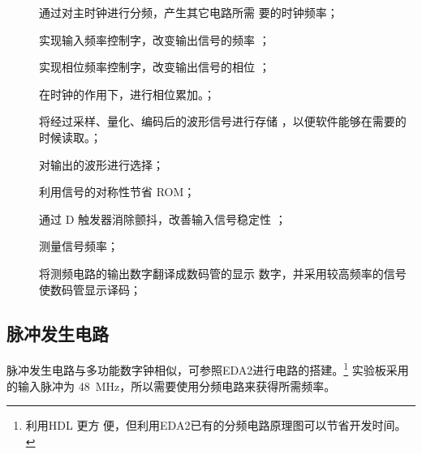 \documentclass[twoside, openright]{article}
\begin{document}
\begin{description}

	\item[] 通过对主时钟进行分频，产生其它电路所需
		要的时钟频率；

	\item[] 实现输入频率控制字，改变输出信号的频率
		；

	\item[] 实现相位频率控制字，改变输出信号的相位
		；

	\item[] 在时钟的作用下，进行相位累加。；

	\item[] 将经过采样、量化、编码后的波形信号进行存储
		，以便软件能够在需要的时候读取。；

	\item[] 对输出的波形进行选择；

	\item[] 利用信号的对称性节省 ROM；

	\item[] 通过 D 触发器消除颤抖，改善输入信号稳定性
		；

	\item[] 测量信号频率；

	\item[] 将测频电路的输出数字翻译成数码管的显示
		数字，并采用较高频率的信号使数码管显示译码；

\end{description}

\subsection{脉冲发生电路}%
\label{sub:脉冲发生电路}

脉冲发生电路与多功能数字钟相似，可参照EDA2进行电路的搭建。\footnote{利用HDL 更方
便，但利用EDA2已有的分频电路原理图可以节省开发时间。} 实验板采用的输入脉冲为
\SI{48}{\MHz}，所以需要使用分频电路来获得所需频率。
\end{document}
